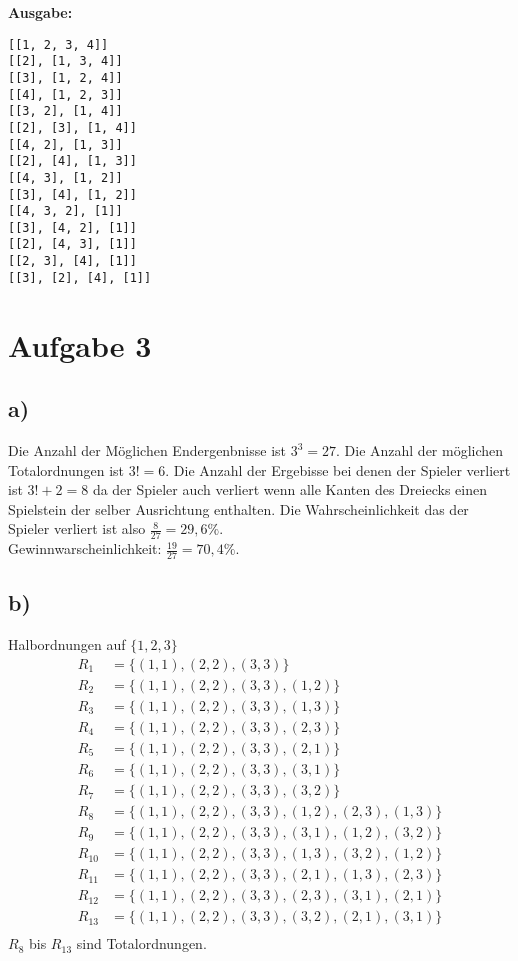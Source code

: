\documentclass[a4paper]{scrartcl}
\begin{document}
\textbf{Ausgabe:}
\begin{lstlisting}
[[1, 2, 3, 4]]
[[2], [1, 3, 4]]
[[3], [1, 2, 4]]
[[4], [1, 2, 3]]
[[3, 2], [1, 4]]
[[2], [3], [1, 4]]
[[4, 2], [1, 3]]
[[2], [4], [1, 3]]
[[4, 3], [1, 2]]
[[3], [4], [1, 2]]
[[4, 3, 2], [1]]
[[3], [4, 2], [1]]
[[2], [4, 3], [1]]
[[2, 3], [4], [1]]
[[3], [2], [4], [1]]
\end{lstlisting}

\section*{Aufgabe 3}
\subsection*{a)}
Die Anzahl der Möglichen Endergenbnisse ist $3^3 = 27$. Die Anzahl der möglichen Totalordnungen ist $3! = 6$.
Die Anzahl der Ergebisse bei denen der Spieler verliert ist $3! + 2 = 8$ da der Spieler auch verliert wenn alle Kanten des Dreiecks einen Spielstein der selber Ausrichtung enthalten.
Die Wahrscheinlichkeit das der Spieler verliert ist also $\frac{8}{27} = 29,6\%$. \\
Gewinnwarscheinlichkeit: $\frac{19}{27} = 70,4\%$.
\subsection*{b)}
Halbordnungen auf $\{1,2,3\}$
\begin{align*}
    R_1 &= \{(1,1),(2,2),(3,3)\} \\
    R_2 &= \{(1,1),(2,2),(3,3), (1,2)\} \\
    R_3 &= \{(1,1),(2,2),(3,3), (1,3)\} \\
    R_4 &= \{(1,1),(2,2),(3,3), (2,3)\} \\
    R_5 &= \{(1,1),(2,2),(3,3), (2,1)\} \\
    R_6 &= \{(1,1),(2,2),(3,3), (3,1)\} \\
    R_7 &= \{(1,1),(2,2),(3,3), (3,2)\} \\
    R_8 &= \{(1,1),(2,2),(3,3), (1,2), (2,3), (1,3)\} \\
    R_9 &= \{(1,1),(2,2),(3,3), (3,1), (1,2), (3,2)\} \\
    R_{10} &= \{(1,1),(2,2),(3,3), (1,3), (3,2), (1,2)\} \\
    R_{11} &= \{(1,1),(2,2),(3,3), (2,1), (1,3), (2,3)\} \\
    R_{12} &= \{(1,1),(2,2),(3,3), (2,3), (3,1), (2,1)\} \\
    R_{13} &= \{(1,1),(2,2),(3,3), (3,2), (2,1), (3,1)\} \\
\end{align*}
$R_8$ bis $R_{13}$ sind Totalordnungen.
\end{document}
